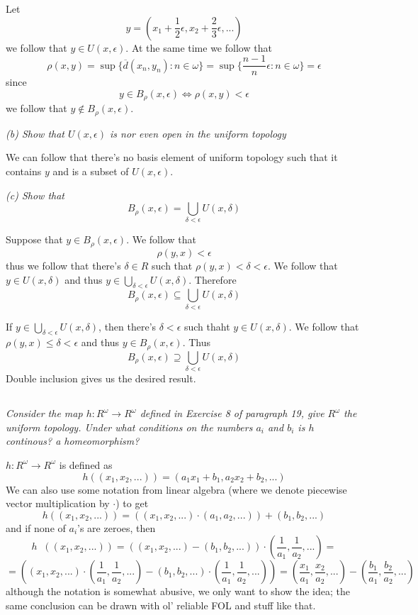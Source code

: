 \documentclass[11pt,oneside,titlepage]{book}
\DeclareMathOperator \inv {^{-1}}
\DeclareMathOperator \lra {\Leftrightarrow}
\newcommand{\set}[1]{\{ #1 \}}
\begin{document}
Let
$$y = (x_1 + \frac{1}{2} \epsilon, x_2 + \frac{2}{3} \epsilon, ...)$$
we follow that $y \in U(x, \epsilon)$. At the same time we follow that
$$\rho(x, y) = \sup\set{\overline{d}(x_n, y_n): n \in \omega} =
\sup\set{\frac{n - 1}{n} \epsilon: n \in \omega} = \epsilon$$
since
$$y \in B_\rho(x, \epsilon) \lra \rho(x, y) < \epsilon$$
we follow that $y \notin B_\rho(x, \epsilon)$.

\textit{(b) Show that $U(x, \epsilon)$ is nor even open in the uniform topology}

We can follow that there's no basis element of uniform topology such that it contains
$y$ and is a subset of $U(x, \epsilon)$.

\textit{(c) Show that
  $$B_\rho(x, \epsilon) = \bigcup_{\delta < \epsilon}{U(x, \delta)}$$
}

Suppose that $y \in B_\rho(x, \epsilon)$. We follow that
$$\rho(y, x) < \epsilon$$
thus we follow that there's $\delta \in R$ such that $\rho(y, x) < \delta < \epsilon$.
We follow that $y \in U(x, \delta)$ and thus $y \in \bigcup_{\delta < \epsilon}{U(x, \delta)}$.
Therefore
$$B_\rho(x, \epsilon) \subseteq \bigcup_{\delta < \epsilon}{U(x, \delta)}$$

If $y \in \bigcup_{\delta < \epsilon}{U(x, \delta)}$, then there's $\delta < \epsilon$
such thaht $y \in U(x, \delta)$. We follow that $\rho(y, x) \leq \delta < \epsilon$ and thus
$y \in B_\rho(x, \epsilon)$. Thus
$$B_\rho(x, \epsilon) \supseteq \bigcup_{\delta < \epsilon}{U(x, \delta)}$$
Double inclusion gives us the desired result.

\subsection{}

\textit{Consider the map $h: R^\omega \to R^\omega$ defined in Exercise 8 of paragraph 19, give
  $R^\omega$ the uniform topology. Under what conditions on the numbers $a_i$ and $b_i$ is $h$
  continous? a homeomorphism?}

$h: R^\omega \to R^\omega$ is defined as
$$h((x_1, x_2, ... )) = (a_1 x_1 + b_1, a_2 x_2 + b_2, ...)$$
We can also use some notation from linear algebra (where we denote piecewise
vector multiplication by $\cdot$) to get
$$h((x_1, x_2, ... )) = ((x_1, x_2, ...) \cdot (a_1, a_2, ...)) + (b_1, b_2, ...) $$
and if none of $a_i$'s are zeroes, then
$$h\inv((x_1, x_2, ...)) = ((x_1, x_2, ... ) - (b_1, b_2, ...))
\cdot (\frac{1}{a_1}, \frac{1}{a_2}, ...) = $$
$$ = ((x_1, x_2, ... ) \cdot (\frac{1}{a_1}, \frac{1}{a_2}, ...) - (b_1, b_2, ...)
\cdot (\frac{1}{a_1}, \frac{1}{a_2}, ...))=
( \frac{x_1}{a_1}, \frac{x_2}{a_2}, ...) - (\frac{b_1}{a_1}, \frac{b_2}{a_2}, ...)$$
although the notation is somewhat abusive, we only want to show the idea; the same
conclusion can be drawn with ol' reliable FOL and stuff like that.
\end{document}
